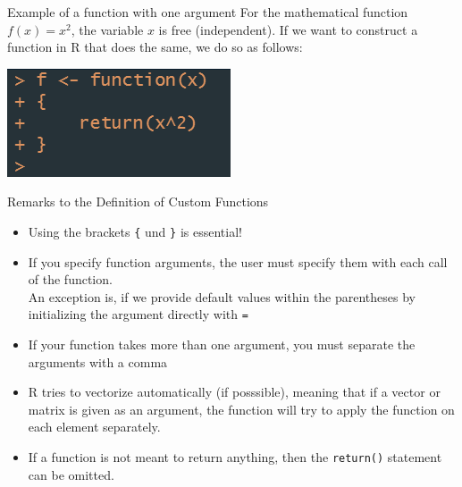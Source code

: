 \documentclass[xcolor=dvipsnames, aspectratio = 169]{beamer}
\begin{document}
\begin{frame}[fragile]{Example of a function with one argument}
  For the mathematical function $f(x) = x^2$, the variable $x$ is free (independent). If we want to construct a function in \textsf R that does the same, we do so as follows: \bigskip \\
  \begin{centering}
    \includegraphics[]{func1.png}
  \end{centering}
\end{frame}

\begin{frame}[fragile]{Remarks to the Definition of Custom Functions}
  \begin{itemize}
    \item Using the brackets \verb+{+ und \verb+}+ is essential!
    \item If you specify function arguments, the user must specify them with each call of the function. \\
An exception is, if we provide default values within the parentheses by initializing the argument directly with \verb+=+
    \item If your function takes more than one argument, you must separate the arguments with a comma 
    \item \textsf R tries to vectorize automatically (if posssible), meaning that if a vector or matrix is given as an argument, the function will try to apply the function on each element separately.
    \item If a function is not meant to return anything, then the \verb+return()+ statement can be omitted.
  \end{itemize}
\end{frame}
\end{document}
